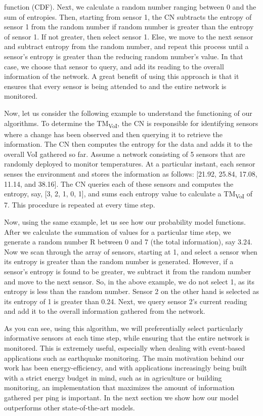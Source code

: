 function (CDF). Next, we calculate a random number ranging between 0
and the sum of entropies. Then, starting from sensor 1, the CN
subtracts the entropy of sensor 1 from the random number if random
number is greater than the entropy of sensor 1. If not greater, then
select sensor 1.  Else, we move to the next sensor and subtract
entropy from the random number, and repeat this process until a
sensor's entropy is greater than the reducing random number's
value. In that case, we choose that sensor to query, and add its
reading to the overall information of the network. A great benefit of
using this approach is that it ensures that every sensor is being
attended to and the entire network is monitored.

Now, let us consider the following example to understand the
functioning of our algorithms. To determine the TM\textsubscript
{VoI}, the CN is responsible for identifying sensors where a change
has been observed and then querying it to retrieve the information.
The CN then computes the entropy for the data and adds it to the
overall VoI gathered so far. Assume a network consisting of 5 sensors
that are randomly deployed to monitor temperatures. At a particular
instant, each sensor senses the environment and stores the information
as follows: [21.92, 25.84, 17.08, 11.14, and 38.16].  The CN queries
each of these sensors and computes the entropy, say, [3, 2, 1, 0, 1],
and sums each entropy value to calculate a TM\textsubscript {VoI} of
7. This procedure is repeated at every time step.

Now, using the same example, let us see how our probability model
functions.  After we calculate the summation of values for a
particular time step, we generate a random number R between 0 and 7
(the total information), say 3.24. Now we scan through the array of
sensors, starting at 1, and select a sensor when its entropy is
greater than the random number is generated. However, if a sensor's
entropy is found to be greater, we subtract it from the random number
and move to the next sensor. So, in the above example, we do not
select 1, as its entropy is less than the random number. Sensor 2 on
the other hand is selected as its entropy of 1 is greater than
0.24. Next, we query sensor 2's current reading and add it to the
overall information gathered from the network.
 
As you can see, using this algorithm, we will preferentially select
particularly informative sensors at each time step, while ensuring
that the entire network is monitored.  This is extremely useful,
especially when dealing with event-based applications such as
earthquake monitoring. The main motivation behind our work has been
energy-efficiency, and with applications increasingly being built with
a strict energy budget in mind, such as in agriculture or building
monitoring, an implementation that maximizes the amount of information
gathered per ping is important.  In the next section we show how our
model outperforms other state-of-the-art models.